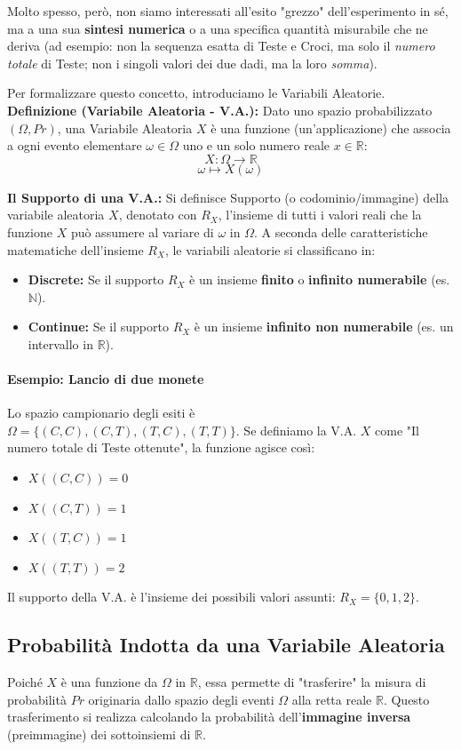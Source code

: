 \documentclass[12pt, a4paper]{article}
\begin{document}
Molto spesso, però, non siamo interessati all'esito "grezzo" dell'esperimento in sé, ma a una sua \textbf{sintesi numerica} o a una specifica quantità misurabile che ne deriva (ad esempio: non la sequenza esatta di Teste e Croci, ma solo il \textit{numero totale} di Teste; non i singoli valori dei due dadi, ma la loro \textit{somma}).

Per formalizzare questo concetto, introduciamo le Variabili Aleatorie.
\textbf{Definizione (Variabile Aleatoria - V.A.):} Dato uno spazio probabilizzato $(\Omega, Pr)$, una Variabile Aleatoria $X$ è una funzione (un'applicazione) che associa a ogni evento elementare $\omega \in \Omega$ uno e un solo numero reale $x \in \mathbb{R}$:
$$ X : \Omega \rightarrow \mathbb{R} $$
$$ \omega \mapsto X(\omega) $$

\textbf{Il Supporto di una V.A.:} 
Si definisce Supporto (o codominio/immagine) della variabile aleatoria $X$, denotato con $R_X$, l'insieme di tutti i valori reali che la funzione $X$ può assumere al variare di $\omega$ in $\Omega$.
A seconda delle caratteristiche matematiche dell'insieme $R_X$, le variabili aleatorie si classificano in:
\begin{itemize}
    \item \textbf{Discrete:} Se il supporto $R_X$ è un insieme \textbf{finito} o \textbf{infinito numerabile} (es. $\mathbb{N}$).
    \item \textbf{Continue:} Se il supporto $R_X$ è un insieme \textbf{infinito non numerabile} (es. un intervallo in $\mathbb{R}$).
\end{itemize}

\paragraph{Esempio: Lancio di due monete}
Lo spazio campionario degli esiti è \\ $\Omega = \{(C,C), (C,T), (T,C), (T,T)\}$.
Se definiamo la V.A. $X$ come "Il numero totale di Teste ottenute", la funzione agisce così:
\begin{itemize}
    \item $X((C,C)) = 0$
    \item $X((C,T)) = 1$
    \item $X((T,C)) = 1$
    \item $X((T,T)) = 2$
\end{itemize}
Il supporto della V.A. è l'insieme dei possibili valori assunti: $R_X = \{0, 1, 2\}$.

\subsection{Probabilità Indotta da una Variabile Aleatoria}
Poiché $X$ è una funzione da $\Omega$ in $\mathbb{R}$, essa permette di "trasferire" la misura di probabilità $Pr$ originaria dallo spazio degli eventi $\Omega$ alla retta reale $\mathbb{R}$. 
Questo trasferimento si realizza calcolando la probabilità dell'\textbf{immagine inversa} (preimmagine) dei sottoinsiemi di $\mathbb{R}$.
\end{document}
